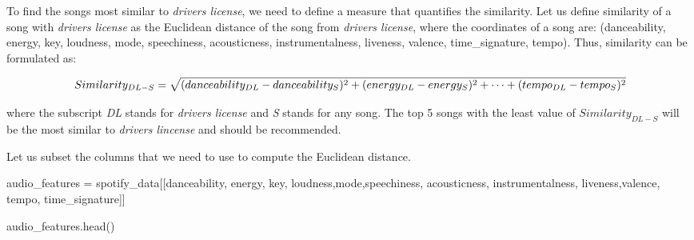 \documentclass[
  letterpaper,
  DIV=11,
  numbers=noendperiod]{scrreprt}
\newenvironment{Shaded}{\begin{snugshade}}{\end{snugshade}}
\newcommand{\NormalTok}[1]{\textcolor[rgb]{0.00,0.23,0.31}{#1}}
\newcommand{\OperatorTok}[1]{\textcolor[rgb]{0.37,0.37,0.37}{#1}}
\newcommand{\StringTok}[1]{\textcolor[rgb]{0.13,0.47,0.30}{#1}}
\begin{document}
To find the songs most similar to \emph{drivers license}, we need to
define a measure that quantifies the similarity. Let us define
similarity of a song with \emph{drivers license} as the Euclidean
distance of the song from \emph{drivers license}, where the coordinates
of a song are: (danceability, energy, key, loudness, mode, speechiness,
acousticness, instrumentalness, liveness, valence, time\_signature,
tempo). Thus, similarity can be formulated as:

\[\scriptsize
Similarity_{DL-S} = \sqrt{(danceability_{DL}-danceability_{S})^2+(energy_{DL}-energy_{S})^2 +\dots + (tempo_{DL}-tempo_{S})^2}
\]

where the subscript \emph{DL} stands for \emph{drivers license} and
\emph{S} stands for any song. The top 5 songs with the least value of
\(Similarity_{DL-S}\) will be the most similar to \emph{drivers
lincense} and should be recommended.

Let us subset the columns that we need to use to compute the Euclidean
distance.

\begin{Shaded}
\begin{Highlighting}[]
\NormalTok{audio\_features }\OperatorTok{=}\NormalTok{ spotify\_data[[}\StringTok{\textquotesingle{}danceability\textquotesingle{}}\NormalTok{, }\StringTok{\textquotesingle{}energy\textquotesingle{}}\NormalTok{, }\StringTok{\textquotesingle{}key\textquotesingle{}}\NormalTok{, }\StringTok{\textquotesingle{}loudness\textquotesingle{}}\NormalTok{,}\StringTok{\textquotesingle{}mode\textquotesingle{}}\NormalTok{,}\StringTok{\textquotesingle{}speechiness\textquotesingle{}}\NormalTok{,}
                               \StringTok{\textquotesingle{}acousticness\textquotesingle{}}\NormalTok{, }\StringTok{\textquotesingle{}instrumentalness\textquotesingle{}}\NormalTok{, }\StringTok{\textquotesingle{}liveness\textquotesingle{}}\NormalTok{,}\StringTok{\textquotesingle{}valence\textquotesingle{}}\NormalTok{, }\StringTok{\textquotesingle{}tempo\textquotesingle{}}\NormalTok{, }\StringTok{\textquotesingle{}time\_signature\textquotesingle{}}\NormalTok{]]}
\end{Highlighting}
\end{Shaded}

\begin{Shaded}
\begin{Highlighting}[]
\NormalTok{audio\_features.head()}
\end{Highlighting}
\end{Shaded}
\end{document}
